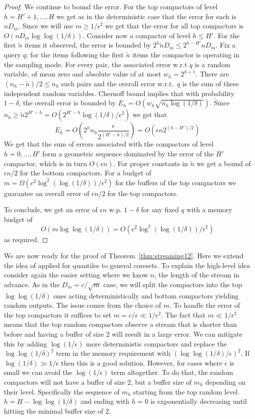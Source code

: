 \documentclass[12pt]{colt2019} %
\newcommand{\eps}{\epsilon}
\begin{document}
{\begin{proof}
We continue to bound the error. For the top compactors of level $h=H'+1,\ldots,H$ we get as in the deterministic case that the error for each is $n D_m$. Since we will use $m \geq 1/\eps^2$ we get that the error for all top compactors is $O(nD_m\log\log(1/\delta))$.
Consider now a compactor of level $h \leq H'$. For the first $\tilde{n}$ items it observed, the error is bounded by $2^h\tilde{n}D_m \leq 2^{h-H'}nD_m$. Fix a query $q$; for the items following the first $\tilde{n}$ items the compactor is operating in the sampling mode. For every pair, the associated error w.r.t $q$ is a random variable, of mean zero and absolute value of at most $w_h=2^{h+1}$. There are $(n_h-\tilde{n})/2 \leq n_h$ such pairs and the overall error w.r.t.\ $q$ is the sum of these independent random variables. Chernoff bound implies that with probability $1-\delta$, the overall error is bounded by $E_h = O(w_h\sqrt{n_h\log(1/\delta)})$. Since $n_h \geq \tilde{n}2^{H'-h} = O(2^{H'-h}\log(1/\delta)/\eps^2)$ we get that
$$ E_h = O\left(2^h n_h\frac{\eps}{2^{(H'-h)/2}}\right) = O(\eps n 2^{(h-H')/2}) $$
We get that the sum of errors associated with the compactors of level $h=0,\ldots,H'$ form a geometric sequence dominated by the error of the $H'$ compactor, which is in turn $O(\eps n)$. For proper constants in $\tilde{n}$ we get a bound of $\eps n/2$ for the bottom compactors. For a budget of $m = \Omega(c^2\log^2(\log(1/\delta))/\eps^2)$ for the buffers of the top compactors we guarantee an overall error of $\eps n/2$ for the top compactors. 

To conclude, we get an error of $\eps n$ w.p. $1-\delta$ for any fixed $q$ with a memory budget of
$$O(m\log\log(1/\delta)) = O\left(c^2\log^3(\log(1/\delta))/\eps^2\right)$$
as required.
\end{proof}

We are now ready for the proof of Theorem~\ref{thm:streaming12}. Here we extend the idea of \cite{DBLP:conf/focs/KarninLL16} applied for quantiles to general coresets. To explain the high-level idea consider again the easier setting where we know $n$, the length of the stream in advance. As in the $D_m=c/\sqrt{m}$ case, we will split the compactors into the top $\log\log(1/\delta)$ ones acting deterministically and bottom compactors yielding random outputs. The issue comes from the choice of $m$. To handle the error of the top compactors it suffices to set $m=c/\eps \ll 1/\eps^2$. The fact that $m \ll 1/\eps^2$ means that the top random compactors observe a stream that is shorter than before and having a buffer of size 2 will result in a large error. We can mitigate this by adding $\log(1/\eps)$ more deterministic compactors and replace the $\log\log(1/\delta)^2$ term in the memory requirement with $\left(\log\log(1/\delta)/\eps\right)^2$. If $\log(1/\delta) \gg 1/\eps$ then this is a good solution. However, for cases where $\eps$ is small we can avoid the $\log(1/\eps)$ term altogether. To do that, the random compactors will not have a buffer of size 2, but a buffer size of $m_h$ depending on their level. Specifically the sequence of $m_h$ starting from the top random level $h= H-\log\log(1/\delta)$ and ending with $h=0$ is exponentially decreasing until hitting the minimal buffer size of $2$.

}
\end{document}
